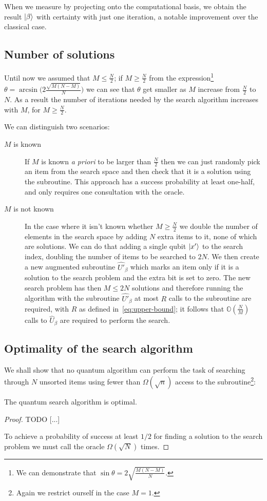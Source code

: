 When we measure by projecting onto the computational basis, we obtain the result $\ket{\beta}$ with certainty with just one iteration, a notable improvement over the classical case.

\subsection{Number of solutions}\label{sec:M}
Until now we assumed that $M\leq \frac{N}{2}$; if $M \geq \frac{N}{2}$ from the expression\footnote{We can demonstrate that $\sin\theta = 2\sqrt{\frac{M(N-M)}{N}}$.} $\theta=\arcsin\biggl(2\frac{\sqrt{M(N-M)}}{N}\biggr)$ we can see that $\theta$ get smaller as $M$ increase from $\frac{N}{2}$ to $N$. As a result the number of iterations needed by the search algorithm increases with $M$, for $M\geq \frac{N}{2}$.

We can distinguish two scenarios:
\begin{description}
   \item[$M$ is known] If $M$ is known \emph{a priori} to be larger than $\frac{N}{2}$ then we can just randomly pick an item from the search space and then check that it is a solution using the subroutine. This approach has a success probability at least one-half, and only requires one consultation with the oracle.
   \item[$M$ is not known] In the case where it isn't known whether $M\geq \frac{N}{2}$ we double the number of elements in the search space by adding $N$ extra items to it, none of which are solutions. We can do that adding a single qubit $\ket{x'}$ to the search index, doubling the number of items to be searched to $2N$. We then create a new augmented subroutine $\hat{U'}_\beta$ which marks an item only if it is a solution to the search problem and the extra bit is set to zero. The new search problem has then $M \leq 2N$ solutions and therefore running the algorithm with the subroutine $\hat{U'}_\beta$ at most $R$ calls to the subroutine are required, with $R$ as defined in~\ref{eq:upper-bound}; it follows that $\mathbb{O}(\frac{N}{M})$ calls to $\hat{U}_\beta$ are required to perform the search.
   
\end{description}
\subsection{Optimality of the search algorithm}
We shall show that no quantum algorithm can perform the task of searching through $N$ unsorted items using fewer than $\Omega(\sqrt{n})$ access to the subroutine\footnote{Again we restrict ourself in the case $M=1$.}:
\begin{theorem}
The quantum search algorithm is optimal. 
\end{theorem}
\begin{proof}
TODO [...]

To achieve a probability of success at least $1/2$ for finding a solution to the search problem we must call the oracle $\Omega(\sqrt{N})$ times.
\end{proof}


